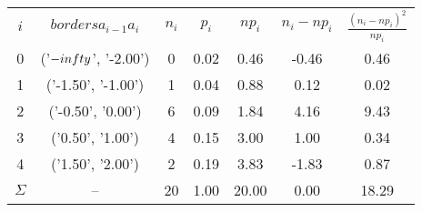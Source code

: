 \begin{table}[H]
    \centering
    \begin{tabular}{c|c|c|c|c|c|c}
        $i$ & $borders a_{i-1} a_{i}$ & $n_i$ & $p_i$ & $np_i$ & $n_i - np_i$ & $\frac{(n_i - np_i)^2}{np_i}$ \\
        0 & ('$-\\infty$', '-2.00') & 0 & 0.02 & 0.46 & -0.46 & 0.46 \\
        1 & ('-1.50', '-1.00') & 1 & 0.04 & 0.88 & 0.12 & 0.02 \\
        2 & ('-0.50', '0.00') & 6 & 0.09 & 1.84 & 4.16 & 9.43 \\
        3 & ('0.50', '1.00') & 4 & 0.15 & 3.00 & 1.00 & 0.34 \\
        4 & ('1.50', '2.00') & 2 & 0.19 & 3.83 & -1.83 & 0.87 \\
        $\Sigma$ & -- & 20 & 1.00 & 20.00 & 0.00 & 18.29 
    \end{tabular}
    \caption{}
    \label{}
\end{table}